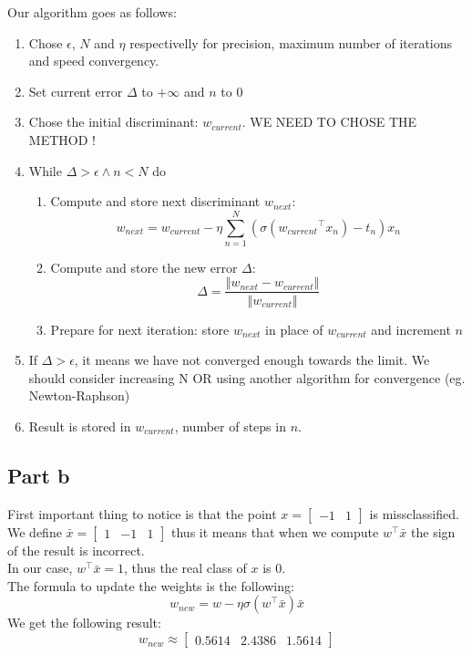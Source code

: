 \documentclass[a4paper, 10pt]{article}
\begin{document}
Our algorithm goes as follows:
\begin{enumerate}
    \item Chose $\epsilon$, $N$ and $\eta$ respectivelly for precision, maximum number of iterations and speed convergency.
    \item Set current error $\Delta$ to $+\infty$ and $n$ to $0$
    \item Chose the initial discriminant: $w_{current}$. WE NEED TO CHOSE THE METHOD ! 
    \item While $\Delta > \epsilon \wedge n < N$ do
    \begin{enumerate}
        \item Compute and store next discriminant $w_{next}$:
$$
w_{next} = w_{current} - \eta \sum_{n=1}^{N}\left(\sigma({w_{current}}^\top x_n)-t_n\right)x_n
$$
        \item Compute and store the new error $\Delta$:
$$
\Delta = \frac{\left\Vert w_{next} - w_{current}\right\Vert}{\left\Vert w_{current} \right\Vert}
$$
        \item Prepare for next iteration: store $w_{next}$ in place of $w_{current}$ and increment $n$
    \end{enumerate}
    \item If $\Delta > \epsilon$, it means we have not converged enough towards the limit. We should consider increasing N OR using another algorithm for convergence (eg. Newton-Raphson)
    \item Result is stored in $w_{current}$, number of steps in $n$. 
\end{enumerate}

\subsection{Part b}
First important thing to notice is that the point $x=\begin{bmatrix}-1 & 1\end{bmatrix}$ is missclassified.
We define $\bar{x} = \begin{bmatrix}1 & -1 & 1\end{bmatrix}$ thus it means that when we compute 
$w^\top \bar{x}$ the sign of the result is incorrect.
\\
In our case, $w^\top \bar{x} = 1$, thus the real class of $x$ is $0$.
\\
The formula to update the weights is the following:
$$
w_{new} = w - \eta \sigma(w^\top \bar{x})\bar{x}
$$
We get the following result:
$$
w_{new} \approx \begin{bmatrix}0.5614 & 2.4386 & 1.5614\end{bmatrix}
$$
\end{document}
